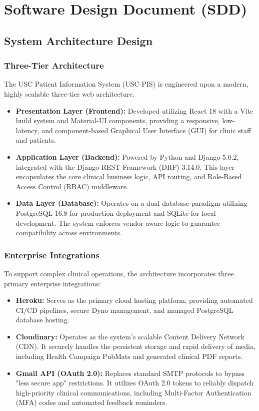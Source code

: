 
\chapter{Software Design Document (SDD)}
\label{appendix:sdd}

\section{System Architecture Design}

\subsection{Three-Tier Architecture}
The USC Patient Information System (USC-PIS) is engineered upon a modern, highly scalable three-tier web architecture.

\begin{itemize}
    \item \textbf{Presentation Layer (Frontend):} Developed utilizing React 18 with a Vite build system and Material-UI components, providing a responsive, low-latency, and component-based Graphical User Interface (GUI) for clinic staff and patients.
    \item \textbf{Application Layer (Backend):} Powered by Python and Django 5.0.2, integrated with the Django REST Framework (DRF) 3.14.0. This layer encapsulates the core clinical business logic, API routing, and Role-Based Access Control (RBAC) middleware.
    \item \textbf{Data Layer (Database):} Operates on a dual-database paradigm utilizing PostgreSQL 16.8 for production deployment and SQLite for local development. The system enforces vendor-aware logic to guarantee compatibility across environments.
\end{itemize}

\subsection{Enterprise Integrations}
To support complex clinical operations, the architecture incorporates three primary enterprise integrations:

\begin{itemize}
    \item \textbf{Heroku:} Serves as the primary cloud hosting platform, providing automated CI/CD pipelines, secure Dyno management, and managed PostgreSQL database hosting.
    \item \textbf{Cloudinary:} Operates as the system's scalable Content Delivery Network (CDN). It securely handles the persistent storage and rapid delivery of media, including Health Campaign PubMats and generated clinical PDF reports.
    \item \textbf{Gmail API (OAuth 2.0):} Replaces standard SMTP protocols to bypass "less secure app" restrictions. It utilizes OAuth 2.0 tokens to reliably dispatch high-priority clinical communications, including Multi-Factor Authentication (MFA) codes and automated feedback reminders.
\end{itemize}

